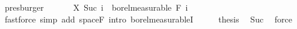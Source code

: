 \begin{isabellebody}
\ presburger\isanewline
\ \ \isacommand{{\isacharbraceright}{\kern0pt}}\isamarkupfalse%
\isanewline
\ \ \isamarkupfalse%
\ {\isachardoublequoteopen}X\ {\isacharparenleft}{\kern0pt}Suc\ i{\isacharparenright}{\kern0pt}\ {\isasymin}\ borel{\isacharunderscore}{\kern0pt}measurable\ {\isacharparenleft}{\kern0pt}F\ i{\isacharparenright}{\kern0pt}{\isachardoublequoteclose}\ \isamarkupfalse%
\ {\isacharparenleft}{\kern0pt}fastforce\ simp\ add{\isacharcolon}{\kern0pt}\ space{\isacharunderscore}{\kern0pt}F\ intro{\isacharbang}{\kern0pt}{\isacharcolon}{\kern0pt}\ borel{\isacharunderscore}{\kern0pt}measurableI{\isacharparenright}{\kern0pt}\isanewline
\ \ \isamarkupfalse%
\ \isamarkupfalse%
\ {\isacharquery}{\kern0pt}thesis\ \isamarkupfalse%
\ Suc\ \isamarkupfalse%
\ force\isanewline
{}\isamarkupfalse%
%
\endisatagproof
{\isafoldproof}%
%
\isadelimproof
\isanewline
%
\endisadelimproof
\isanewline
{}\isamarkupfalse%
\isanewline
\isanewline
\isanewline
%
\isadelimtheory
\isanewline
%
\endisadelimtheory
%
\isatagtheory
{}\isamarkupfalse%
%
\endisatagtheory
{\isafoldtheory}%
%
\isadelimtheory
%
\endisadelimtheory
%
\end{isabellebody}%
\endinput
